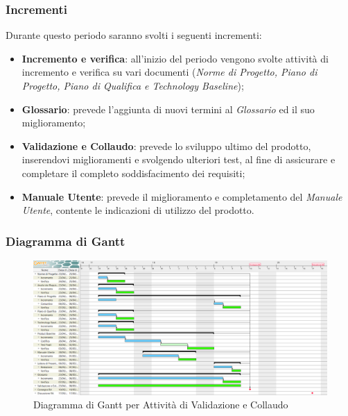 \subsubsection{Incrementi}
Durante questo periodo saranno svolti i seguenti incrementi:
\begin{itemize}
	\item \textbf{Incremento e verifica}: all'inizio del periodo vengono svolte attività di incremento e verifica su vari documenti (\textit{Norme di Progetto, Piano di Progetto, Piano di Qualifica e Technology Baseline});
	\item \textbf{Glossario}: prevede l'aggiunta di nuovi termini al \textit{Glossario} ed il suo miglioramento;
	\item \textbf{Validazione e Collaudo}: prevede lo sviluppo ultimo del prodotto, inserendovi miglioramenti e svolgendo ulteriori test, al fine di assicurare e completare il completo soddisfacimento dei requisiti;
	\item \textbf{Manuale Utente}: prevede il miglioramento e completamento del \textit{Manuale Utente}, contente le indicazioni di utilizzo del prodotto.
\end{itemize}

\begin{landscape}
\subsubsection{Diagramma di Gantt}
\begin{figure}[H]
	\centering
  		\includegraphics[width=1.0\linewidth]{./images/ValidazioneeCollaudo.png}
  		\caption{Diagramma di Gantt per Attività di Validazione e Collaudo}
  		\label{fig:Gantt Validazione e Collaudo}
\end{figure}
\end{landscape}